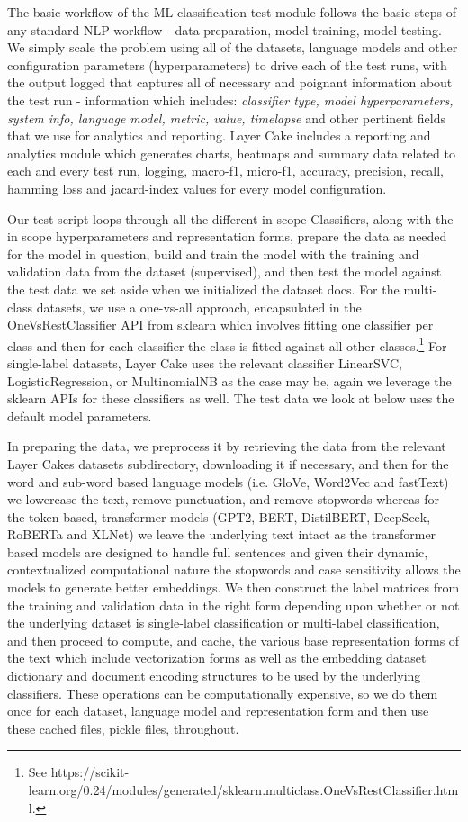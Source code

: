 \documentclass[final]{clv2025-revised}
\begin{document}
The basic workflow of the ML classification test module follows the basic steps of any standard NLP workflow - data preparation, model training, model testing. We simply scale the problem using all of the datasets, language models and other configuration parameters (hyperparameters) to drive each of the test runs, with the output logged that captures all of necessary and poignant information about the test run - information which includes: \textit{classifier type, model hyperparameters, system info, language model, metric, value, timelapse} and other pertinent fields that we use for analytics and reporting. Layer Cake includes a reporting and analytics module which generates charts, heatmaps and summary data related to each and every test run, logging, macro-f1, micro-f1, accuracy, precision, recall, hamming loss and jacard-index values for every model configuration. 

Our test script loops through all the different in scope Classifiers, along with the in scope hyperparameters and representation forms, prepare the data as needed for the model in question, build and train the model with the training and validation data from the dataset (supervised), and then test the model against the test data we set aside when we initialized the dataset docs. For the multi-class datasets, we use a one-vs-all approach, encapsulated in the OneVsRestClassifier API from sklearn which involves fitting one classifier per class and then for each classifier the class is fitted against all other classes.\footnote{See https://scikit-learn.org/0.24/modules/generated/sklearn.multiclass.OneVsRestClassifier.html.}  For single-label datasets, Layer Cake uses the relevant classifier LinearSVC, LogisticRegression, or MultinomialNB as the case may be, again we leverage the sklearn APIs for these classifiers as well. The test data we look at below uses the default model parameters.

In preparing the data, we preprocess it by retrieving the data from the relevant Layer Cakes datasets subdirectory, downloading it if necessary, and then for the word and sub-word based language models (i.e. GloVe, Word2Vec and fastText) we lowercase the text, remove punctuation, and remove stopwords whereas for the token based, transformer models (GPT2, BERT, DistilBERT, DeepSeek, RoBERTa and XLNet) we leave the underlying text intact as the transformer based models are designed to handle full sentences and given their dynamic, contextualized computational nature the stopwords and case sensitivity allows the models to generate better embeddings. We then construct the label matrices from the training and validation data in the right form depending upon whether or not the underlying dataset is single-label classification or multi-label classification, and then proceed to compute, and cache, the various base representation forms of the text which include vectorization forms as well as the embedding dataset dictionary and document encoding structures to be used by the underlying classifiers. These operations can be computationally expensive, so we do them once for each dataset, language model and representation form and then use these cached files, pickle files, throughout. 
\end{document}
